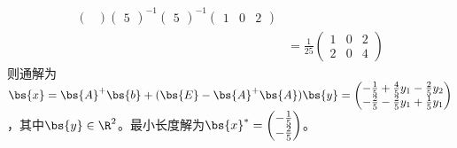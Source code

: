 \documentclass[12pt, a4paper, oneside, UTF8]{ctexbook}
\begin{document}
\begin{solution}
\begin{align*}
\begin{pmatrix}
        \end{pmatrix}\begin{pmatrix}
            5
        \end{pmatrix}^{-1}\begin{pmatrix}
            5
        \end{pmatrix}^{-1}\begin{pmatrix}
            1&0&2
        \end{pmatrix}\\
        &=\frac{1}{25}\begin{pmatrix}
            1&0&2\\
            2&0&4
        \end{pmatrix}
    \end{align*}
    则通解为$\bs{x}=\bs{A}^+\bs{b}+(\bs{E}-\bs{A}^+\bs{A})\bs{y}
    =\begin{pmatrix}
        -\frac{1}{5}+\frac{4}{5}y_1-\frac{2}{5}y_2\\
        -\frac{2}{5}-\frac{2}{5}y_1+\frac{1}{5}y_1
    \end{pmatrix}$，其中$\bs{y}\in \R^2$。最小长度解为$\bs{x}^{*}=\begin{pmatrix}
        -\frac{1}{5}\\
        -\frac{2}{5}
    \end{pmatrix}$。

\end{solution}
\end{document}
